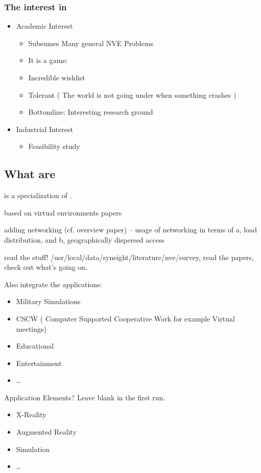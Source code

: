 \subsubsection{The interest in \MMORGS}
\begin{itemize}
	\item Academic Interest
	\begin{itemize}
		\item Subsumes Many general NVE Problems
		\item It is a game:
		\item Incredible wishlist
		\item Tolerant ( The world is not going under when something crashes )
		\item Bottomline: Interesting research ground
	\end{itemize}
	\item Industrial Interest
	\begin{itemize}
		\item Feasibility study
	\end{itemize}
\end{itemize}

\subsection{What are \NVES}

\MMORG is a specialization of \NVE.

based on virtual environments papers

adding networking (cf. overview paper) -- usage of networking in terms
of a, load distribution, and b, geographically dispersed access

read the stuff! /usr/local/data/syneight/literature/nve/survey, read
the papers, check out what's going on.

Also integrate the applications:
\begin{itemize}
        \item Military Simulations
        \item CSCW ( Computer Supported Cooperative Work for example
              Virtual meetings)
        \item Educational
        \item Entertainment
        \item \dots
\end{itemize}

Application Elements? Leave blank in the first run.
\begin{itemize}
        \item X-Reality
        \item Augmented Reality
        \item Simulation
        \item \dots
\end{itemize}

